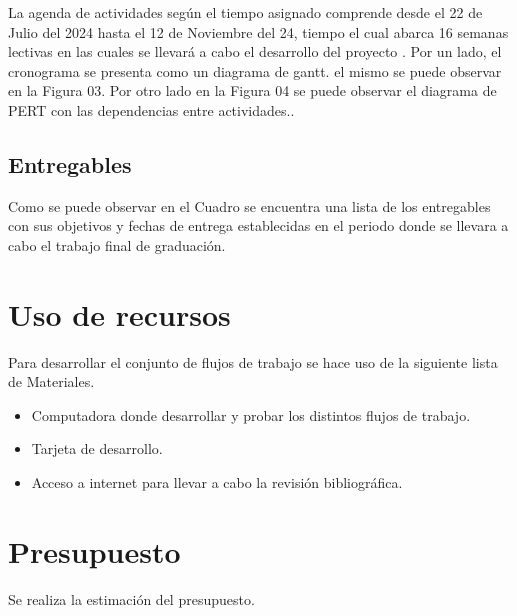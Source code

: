 \documentclass[12pt]{article}
\begin{document}
La agenda de actividades según el tiempo asignado comprende desde el 22 de Julio del 2024 hasta el 12 de Noviembre del 24, tiempo el cual abarca 16 semanas lectivas en las cuales se llevará a cabo el desarrollo del proyecto . Por un lado, el cronograma se presenta como un diagrama de gantt. el mismo se puede observar en la Figura 03. Por otro lado en la Figura 04 se puede observar el diagrama de PERT con las dependencias entre actividades..

\newpage



\subsection{Entregables}

Como se puede observar en el Cuadro se encuentra una lista de los entregables con sus objetivos y fechas de entrega establecidas en el periodo donde se llevara a cabo el trabajo final de graduación.



\section{Uso de recursos}

Para desarrollar el conjunto de flujos de trabajo se hace uso de la siguiente lista de Materiales.

\begin{itemize}
  \item Computadora donde desarrollar y probar los distintos flujos de trabajo.
  \item Tarjeta de desarrollo.
  \item Acceso a internet para llevar a cabo la revisión bibliográfica.
\end{itemize}

\newpage

\section{Presupuesto}

Se realiza la estimación del presupuesto. 


\newpage



\end{document}
